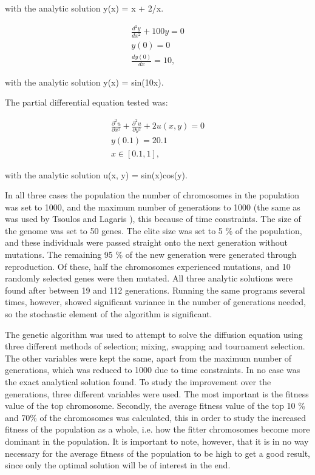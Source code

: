 \documentclass[multicolumn, 12pt]{extarticle}
\begin{document}
with the analytic solution y(x) = x + 2/x.

\begin{align*}
	\frac{d^{2}y}{dx^{2}}  + 100y = 0 \\
	y(0) = 0                          \\
	\frac{dy(0)}{dx} = 10,
\end{align*}

with the analytic solution y(x) = sin(10x).

The partial differential equation tested was:

\begin{align*}
	\frac{\partial^{2}u}{\partial x^{2}} + \frac{\partial^{2}u}{\partial y^{2}} + 2u(x, y) = 0 \\
	y(0.1) = 20.1                                                                              \\
	x \in [0.1, 1],
\end{align*}

with the analytic solution u(x, y) = sin(x)cos(y).

In all three cases the population the number of chromosomes in the population was set to 1000, and the maximum number of generations to 1000 (the same as was used by Tsoulos and Lagaris \cite{Lagaris}), this because of time constraints. The size of the genome was set to 50 genes. The elite size was set to 5 \% of the population, and these individuals were passed straight onto the next generation without mutations. The remaining 95 \% of the new generation were generated through reproduction. Of these, half the chromosomes experienced mutations, and 10 randomly selected genes were then mutated. All three analytic solutions were found after between 19 and 112 generations. Running the same programs several times, however, showed significant variance in the number of generations needed, so the stochastic element of the algorithm is significant.

The genetic algorithm was used to attempt to solve the diffusion equation using three different methods of selection; mixing, swapping and tournament selection. The other variables were kept the same, apart from the maximum number of generations, which was reduced to 1000 due to time constraints. In no case was the exact analytical solution found. To study the improvement over the generations, three different variables were used. The most important is the fitness value of the top chromosome. Secondly, the average fitness value of the top 10 \% and 70\% of the chromosomes was calculated, this in order to study the increased fitness of the population as a whole, i.e. how the fitter chromosomes become more dominant in the population. It is important to note, however, that it is in no way necessary for the average fitness of the population to be high to get a good result, since only the optimal solution will be of interest in the end.
\end{document}
